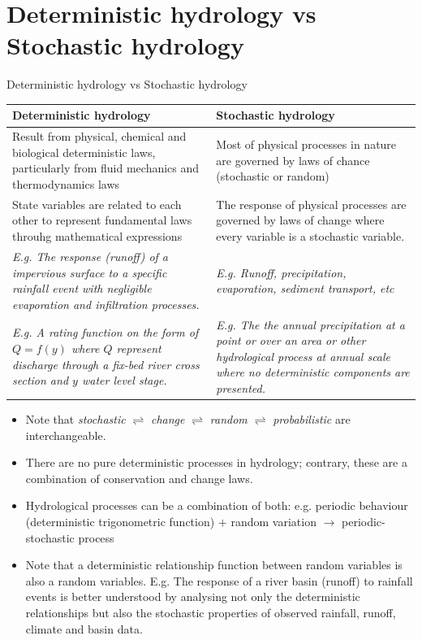 \documentclass[8pt]{beamer}
\begin{document}
\section{Deterministic hydrology vs Stochastic hydrology}
\begin{frame}{Deterministic hydrology vs Stochastic hydrology}
    
    \begin{tabular}{p{5.5cm}p{5.5cm}}  %
    \hline
    \alert{Deterministic hydrology} & \alert{Stochastic hydrology} \\
    \hline
    Result from physical, chemical and biological deterministic laws, particularly from fluid mechanics and thermodynamics laws & Most of physical processes in nature are governed by laws of chance (stochastic or random) \\ \hline
    State variables are related to each other to represent fundamental laws throuhg mathematical expressions & The response of physical processes are governed by laws of change where every variable is a stochastic variable. \\\hline
    \emph{E.g. The response (runoff) of a impervious surface to a specific rainfall event with negligible evaporation and infiltration processes.} & \emph{E.g. Runoff, precipitation, evaporation, sediment transport, etc} \\\hline
    \emph{E.g. A rating function on the form of $Q = f(y)$ where $Q$ represent discharge through a fix-bed river cross section and $y$ water level stage.} &  \emph{E.g. The the annual precipitation at a point or over an area or other hydrological process at annual scale where no deterministic components are presented.}\\ \hline
    \end{tabular}
    \begin{itemize}
        \item Note that \emph{stochastic} $\rightleftharpoons$ \emph{change} $\rightleftharpoons$ \emph{random} $\rightleftharpoons$ \emph{probabilistic} are interchangeable. 
        \item There are no pure deterministic processes in hydrology; contrary, these are a combination of conservation and change laws.  
        \item Hydrological processes can be a combination of both: e.g. periodic behaviour (deterministic trigonometric function) $+$ random variation  $\rightarrow$ \alert{periodic-stochastic process}
        \item Note that a deterministic relationship function between random variables is also a random variables. E.g. The response of a river basin (runoff) to rainfall events is better understood by analysing not only the deterministic relationships but also the stochastic properties of observed rainfall, runoff, climate and basin data. 
    \end{itemize}
\end{frame}
\end{document}
